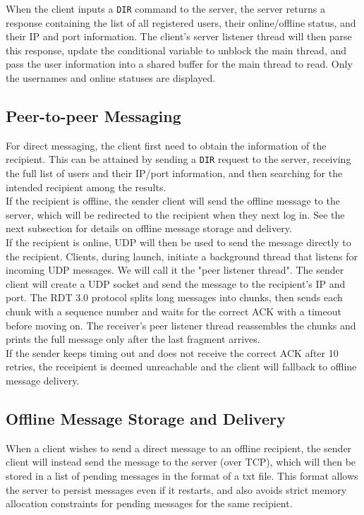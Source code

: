 \documentclass[11pt]{article}
\begin{document}
When the client inputs a \texttt{DIR} command to the server, 
the server returns a response containing the list of all registered users, 
their online/offline status, and their IP and port information. 
The client's server listener thread will then parse this response, 
update the conditional variable to unblock the main thread, 
and pass the user information into a shared buffer for the main thread to read.
Only the usernames and online statuses are displayed.

\subsection{Peer-to-peer Messaging}
For direct messaging, the client first need to obtain the information of the recipient. 
This can be attained by sending a \texttt{DIR} request to the server, 
receiving the full list of users and their IP/port information, 
and then searching for the intended recipient among the results. \\

If the recipient is offline, the sender client will send the offline message to the server, 
which will be redirected to the recipient when they next log in. 
See the next subsection for details on offline message storage and delivery. \\

If the recipient is online, UDP will then be used to send the message directly to the recipient. 
Clients, during launch, initiate a background thread that listens for incoming UDP messages.
We will call it the "peer listener thread". 
The sender client will create a UDP socket and send the message to the recipient's IP and port. 
The RDT 3.0 protocol splits long messages into chunks, 
then sends each chunk with a sequence number and waits for the correct ACK with a timeout before moving on. 
The receiver's peer listener thread reassembles the chunks and 
prints the full message only after the last fragment arrives. \\

If the sender keeps timing out and does not receive the correct ACK after 10 retries, 
the receipient is deemed unreachable and the client will fallback to offline message delivery.

\subsection{Offline Message Storage and Delivery}
When a client wishes to send a direct message to an offline recipient,
the sender client will instead send the message to the server (over TCP), 
which will then be stored in a list of pending messages in the format of a txt file.
This format allows the server to persist messages even if it restarts, 
and also avoids strict memory allocation constraints for pending messages for the same recipient. \\
\end{document}
